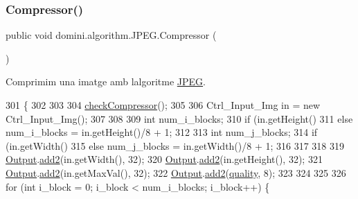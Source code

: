 \subsubsection{\texorpdfstring{Compressor()}{Compressor()}}
{\footnotesize\ttfamily public void domini.\+algorithm.\+J\+P\+E\+G.\+Compressor (\begin{DoxyParamCaption}{ }\end{DoxyParamCaption})\hspace{0.3cm}{\ttfamily [inline]}}



Comprimim una imatge amb l\textquotesingle{}algoritme \hyperlink{classdomini_1_1algorithm_1_1JPEG}{J\+P\+EG}. 


\begin{DoxyCode}
301                              \{
302         
303 
304         \hyperlink{classdomini_1_1algorithm_1_1Algorithm_a070b7e7dcc453b03751d265beae5306c}{checkCompressor}();
305         
306         Ctrl\_Input\_Img in = \textcolor{keyword}{new} Ctrl\_Input\_Img();
307 
308         
309         \textcolor{keywordtype}{int} num\_i\_blocks;
310         \textcolor{keywordflow}{if} (in.getHeight()%
311         \textcolor{keywordflow}{else} num\_i\_blocks = in.getHeight()/8 + 1;
312         
313         \textcolor{keywordtype}{int} num\_j\_blocks;
314         \textcolor{keywordflow}{if} (in.getWidth()%
315         \textcolor{keywordflow}{else} num\_j\_blocks = in.getWidth()/8 + 1;
316         
317         
318 
319         \hyperlink{classdomini_1_1algorithm_1_1Algorithm_a4de9955411c656325adc391ef570c082}{Output}.\hyperlink{classpersistencia_1_1output_1_1Ctrl__Output_ad4738467c2312b0e079c14003e548dd6}{add2}(in.getWidth(), 32);
320         \hyperlink{classdomini_1_1algorithm_1_1Algorithm_a4de9955411c656325adc391ef570c082}{Output}.\hyperlink{classpersistencia_1_1output_1_1Ctrl__Output_ad4738467c2312b0e079c14003e548dd6}{add2}(in.getHeight(), 32);
321         \hyperlink{classdomini_1_1algorithm_1_1Algorithm_a4de9955411c656325adc391ef570c082}{Output}.\hyperlink{classpersistencia_1_1output_1_1Ctrl__Output_ad4738467c2312b0e079c14003e548dd6}{add2}(in.getMaxVal(), 32);
322         \hyperlink{classdomini_1_1algorithm_1_1Algorithm_a4de9955411c656325adc391ef570c082}{Output}.\hyperlink{classpersistencia_1_1output_1_1Ctrl__Output_ad4738467c2312b0e079c14003e548dd6}{add2}(\hyperlink{classdomini_1_1algorithm_1_1JPEG_ae80176d5ff56e613643db55e21c513da}{quality}, 8);
323 
324         
325 
326         \textcolor{keywordflow}{for} (\textcolor{keywordtype}{int} i\_block = 0; i\_block < num\_i\_blocks; i\_block++)  \{

\end{DoxyCode}
